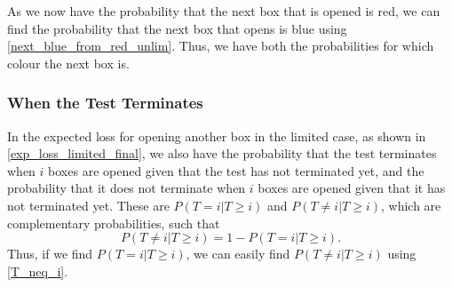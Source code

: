 As we now have the probability that the next box that is opened is red, we can find the probability that the next box that opens is blue using \eqref{next_blue_from_red_unlim}. Thus, we have both the probabilities for which colour the next box is. 



\subsubsection{When the Test Terminates}
In the expected loss for opening another box in the limited case, as shown in \eqref{exp_loss_limited_final}, we also have the probability that the test terminates when $i$ boxes are opened given that the test has not terminated yet, 
and the probability that it does not terminate when $i$ boxes are opened given that it has not terminated yet. 
These are $P(T=i|T\geq i)$ and $P(T\neq i|T\geq i)$, which are complementary probabilities, such that
\begin{equation}
\label{T_neq_i}
    P(T \neq i|T\geq i) = 1-P(T=i|T\geq i).
\end{equation}
Thus, if we find $P(T=i|T\geq i)$, we can easily find $P(T\neq i|T\geq i)$ using \eqref{T_neq_i}. 

